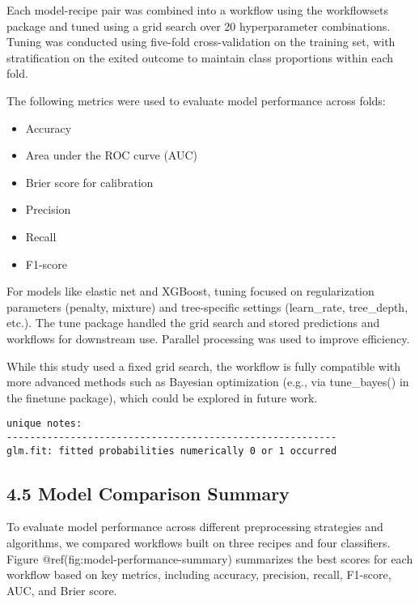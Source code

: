 \documentclass[
  letterpaper,
  DIV=11,
  numbers=noendperiod]{scrartcl}
\providecommand{\tightlist}{%
  \setlength{\itemsep}{0pt}\setlength{\parskip}{0pt}}\usepackage{longtable,booktabs,array}
\begin{document}
Each model-recipe pair was combined into a workflow using the
workflowsets package and tuned using a grid search over 20
hyperparameter combinations. Tuning was conducted using five-fold
cross-validation on the training set, with stratification on the exited
outcome to maintain class proportions within each fold.

The following metrics were used to evaluate model performance across
folds:

\begin{itemize}
\tightlist
\item
  Accuracy
\item
  Area under the ROC curve (AUC)
\item
  Brier score for calibration
\item
  Precision
\item
  Recall
\item
  F1-score
\end{itemize}

For models like elastic net and XGBoost, tuning focused on
regularization parameters (penalty, mixture) and tree-specific settings
(learn\_rate, tree\_depth, etc.). The tune package handled the grid
search and stored predictions and workflows for downstream use. Parallel
processing was used to improve efficiency.

While this study used a fixed grid search, the workflow is fully
compatible with more advanced methods such as Bayesian optimization
(e.g., via tune\_bayes() in the finetune package), which could be
explored in future work.

\begin{verbatim}
unique notes:
---------------------------------------------------------
glm.fit: fitted probabilities numerically 0 or 1 occurred
\end{verbatim}

\subsection{4.5 Model Comparison
Summary}\label{model-comparison-summary}

To evaluate model performance across different preprocessing strategies
and algorithms, we compared workflows built on three recipes and four
classifiers. Figure @ref(fig:model-performance-summary) summarizes the
best scores for each workflow based on key metrics, including accuracy,
precision, recall, F1-score, AUC, and Brier score.
\end{document}
